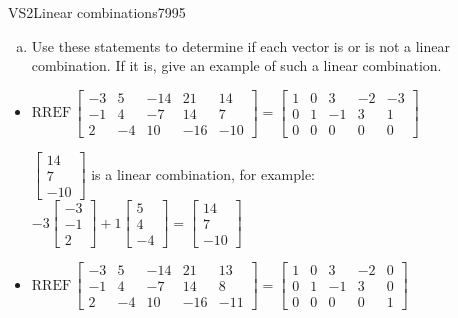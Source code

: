 \begin{exercise}{VS2}{Linear combinations}{7995}
\begin{exerciseStatement}
\begin{enumerate}[(a)]
\begin{itemize}
 
\end{itemize}

     
\item  

 Use these statements to determine if each vector is or is not a linear combination. If it is, give an example of such a linear combination. 

 
\end{enumerate}

     \end{exerciseStatement}
 \begin{exerciseAnswer} 

\begin{itemize}
\item  

 \(
\mathrm{RREF}\, \left[\begin{array}{cccc|c}
-3 & 5 & -14 & 21 & 14 \\
-1 & 4 & -7 & 14 & 7 \\
2 & -4 & 10 & -16 & -10
\end{array}\right] = \left[\begin{array}{cccc|c}
1 & 0 & 3 & -2 & -3 \\
0 & 1 & -1 & 3 & 1 \\
0 & 0 & 0 & 0 & 0
\end{array}\right]
                        \) 

 

 \(\left[\begin{array}{c}
14 \\
7 \\
-10
\end{array}\right]\) is a linear combination, for example: \(
-3 \left[\begin{array}{c}
-3 \\
-1 \\
2
\end{array}\right] + 1 \left[\begin{array}{c}
5 \\
4 \\
-4
\end{array}\right] = \left[\begin{array}{c}
14 \\
7 \\
-10
\end{array}\right]
                            \) 

 
\item  

 \(
\mathrm{RREF}\, \left[\begin{array}{cccc|c}
-3 & 5 & -14 & 21 & 13 \\
-1 & 4 & -7 & 14 & 8 \\
2 & -4 & 10 & -16 & -11
\end{array}\right] = \left[\begin{array}{cccc|c}
1 & 0 & 3 & -2 & 0 \\
0 & 1 & -1 & 3 & 0 \\
0 & 0 & 0 & 0 & 1
\end{array}\right]
                        \) 


\end{itemize}
\end{exerciseAnswer}
\end{exercise}
